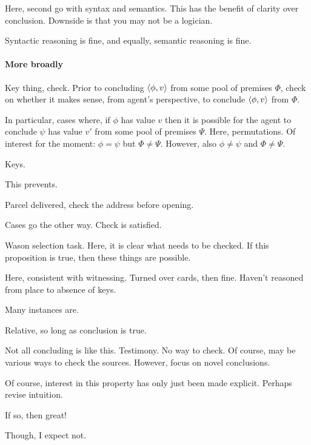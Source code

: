 \begin{note}
  Here, second go with syntax and semantics.
  This has the benefit of clarity over conclusion.
  Downside is that you may not be a logician.

  Syntactic reasoning is fine, and equally, semantic reasoning is fine.
\end{note}

\paragraph{More broadly}

\begin{note}
  Key thing, check.
  Prior to concluding \(\langle \phi, v \rangle\) from some pool of premises \(\Phi\), check on whether it makes sense, from agent's perspective, to conclude \(\langle \phi, v \rangle\) from \(\Phi\).

  In particular, cases where, if \(\phi\) has value \(v\) then it is possible for the agent to conclude \(\psi\) has value \(v'\) from some pool of premises \(\Psi\).
  Here, permutations.
  Of interest for the moment:
  \(\phi = \psi\) but \(\Phi \ne \Psi\).
  However, also \(\phi \ne \psi\) and \(\Phi \ne \Psi\).

  Keys.

  This prevents.

  Parcel delivered, check the address before opening.

  Cases go the other way.
  Check is satisfied.

  Wason selection task.
  Here, it is clear what needs to be checked.
  If this proposition is true, then these things are possible.

  Here, consistent with witnessing.
  Turned over cards, then fine.
  Haven't reasoned from place to absence of keys.

  Many instances are.

  Relative, so long as conclusion is true.
\end{note}

\begin{note}
  Not all concluding is like this.
  Testimony.
  No way to check.
  Of course, may be various ways to check the sources.
  However, focus on novel conclusions.
\end{note}

\begin{note}
  Of course, interest in this property has only just been made explicit.
  Perhaps revise intuition.

  If so, then great!

  Though, I expect not.
\end{note}

